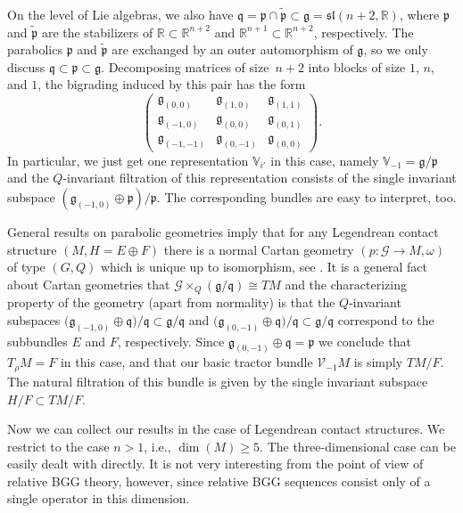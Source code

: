 \documentclass[10pt,a4paper]{amsart}
\numberwithin{equation}{section}
\def\frak{\mathfrak}
\def\Bbb{\mathbb}
\def\Cal{\mathcal}
\newcommand{\x}{\times}
\newcommand{\om}{\omega}
\begin{document}
On the level of Lie algebras, we also have
$\frak q=\frak p\cap\tilde{\frak p}\subset\frak g=\frak{sl}(n+2,\Bbb R)$, where
$\frak p$ and $\tilde{\frak p}$ are the stabilizers of $\Bbb R\subset\Bbb R^{n+2}$
and $\Bbb R^{n+1}\subset\Bbb R^{n+2}$, respectively. The parabolics $\frak p$ and
$\tilde{\frak p}$ are exchanged by an outer automorphism of $\frak g$, so we only
discuss $\frak q\subset\frak p\subset\frak g$. Decomposing matrices of size~${n+2}$
into blocks of size $1$, $n$, and $1$, the bigrading induced by this pair has the
form
\begin{equation}\label{bigrading}
\begin{pmatrix} \frak g_{(0,0)} & \frak g_{(1,0)} & \frak g_{(1,1)} \\
 \frak g_{(-1,0)} & \frak g_{(0,0)} & \frak g_{(0,1)} \\
 \frak g_{(-1,-1)} & \frak g_{(0,-1)} & \frak g_{(0,0)}
\end{pmatrix}.
\end{equation}
In particular, we just get one representation $\Bbb V_{i'}$ in this case, namely $\Bbb
V_{-1}=\frak g/\frak p$ and the $Q$-invariant filtration of this representation
consists of the single invariant subspace $(\frak g_{(-1,0)}\oplus\frak p)/\frak
p$. The corresponding bundles are easy to interpret, too.

General results on parabolic geometries imply that for any Legendrean contact
structure $(M,H=E\oplus F)$ there is a normal Cartan geometry $(p\colon \Cal G\to M,\om)$
of type $(G,Q)$ which is unique up to isomorphism, see \cite[Section 4.2.3]{book}.
It is a general fact about Cartan geometries that $\Cal G\x_Q(\frak
g/\frak q)\cong TM$ and the characterizing property of the geometry (apart from
normality) is that the $Q$-invariant subspaces $\bigl(\frak g_{(-1,0)}\oplus \frak
q\bigr)/\frak q\subset\frak g/\frak q$ and $\bigl(\frak g_{(0,-1)}\oplus \frak q\bigr)/\frak
q\subset\frak g/\frak q$ correspond to the subbundles $E$ and $F$,
respectively. Since $\frak g_{(0,-1)}\oplus \frak q=\frak p$ we conclude that
$T_{\rho}M=F$ in this case, and that our basic tractor bundle $\Cal V_{-1}M$ is
simply $TM/F$. The natural filtration of this bundle is given by the single invariant
subspace $H/F\subset TM/F$.

Now we can collect our results in the case of Legendrean contact structures. We
restrict to the case $n>1$, i.e., $\dim(M)\geq 5$. The three-dimensional case can be
easily dealt with directly. It is not very interesting from the point of view of
relative BGG theory, however, since relative BGG sequences consist only of a single
operator in this dimension.
\end{document}

